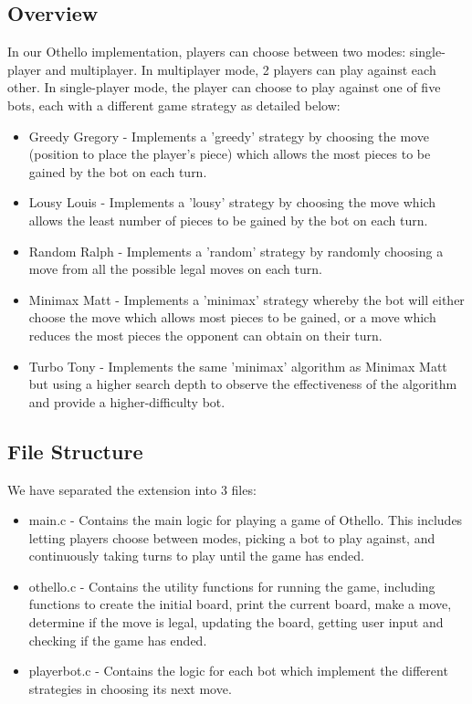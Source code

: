 \documentclass[a4paper,11pt]{article}
\begin{document}
\subsection{Overview}
In our Othello implementation, players can choose between two modes: single-player and multiplayer. In multiplayer mode, 2 players can play against each other. In single-player mode, the player can choose to play against one of five bots, each with a different game strategy as detailed below:
\begin{itemize}
\item Greedy Gregory - Implements a 'greedy' strategy by choosing the move (position to place the player's piece) which allows the most pieces to be gained by the bot on each turn.

\item Lousy Louis - Implements a 'lousy' strategy by choosing the move which allows the least number of pieces to be gained by the bot on each turn.

\item Random Ralph - Implements a 'random' strategy by randomly choosing a move from all the possible legal moves on each turn.

\item Minimax Matt - Implements a 'minimax' strategy whereby the bot will either choose the move which allows most pieces to be gained, or a move which reduces the most pieces the opponent can obtain on their turn.

\item Turbo Tony - Implements the same 'minimax' algorithm as Minimax Matt but using a higher search depth to observe the effectiveness of the algorithm and provide a higher-difficulty bot.
\end{itemize}

\subsection{File Structure}
We have separated the extension into 3 files:
\begin{itemize}
\item main.c - Contains the main logic for playing a game of Othello. This includes letting players choose between modes, picking a bot to play against, and continuously taking turns to play until the game has ended.

\item othello.c - Contains the utility functions for running the game, including functions to create the initial board, print the current board, make a move, determine if the move is legal, updating the board, getting user input and checking if the game has ended.

\item playerbot.c - Contains the logic for each bot which implement the different strategies in choosing its next move.
\end{itemize} 
\end{document}
